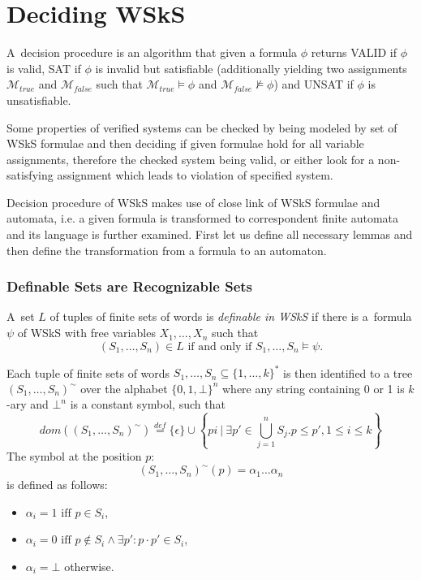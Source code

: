 \section{Deciding WSkS}\label{classical}

A~decision procedure is an algorithm that given a formula $\phi$ returns VALID if $\phi$ is valid, SAT if $\phi$ is invalid but satisfiable (additionally yielding two assignments $\mathcal{M}_{true}$ and $\mathcal{M}_{false}$ such that $\mathcal{M}_{true} \vDash \phi$ and $\mathcal{M}_{false} \not\vDash \phi$) and UNSAT if $\phi$ is unsatisfiable.

Some properties of verified systems can be checked by being modeled by set of WSkS formulae and then deciding if given formulae hold for all variable assignments, therefore the checked system being valid, or either look for a non-satisfying assignment which leads to violation of specified system.

Decision procedure of WSkS makes use of close link of WSkS formulae and automata, i.e. a given formula is transformed to correspondent finite automata and its language is further examined. First let us define all necessary lemmas and then define the transformation from a formula to an automaton.

 \subsubsection{Definable Sets are Recognizable Sets}
\begin{defz}
 A~set $L$ of tuples of finite sets of words is \emph{definable in WSkS} if there is a~formula $\psi$ of WSkS with free variables $X_1,\ldots,X_n$ such that $$(S_1,\ldots,S_n) \in L \text{ if and only if } S_1,\ldots,S_n \vDash \psi.$$
\end{defz}

Each tuple of finite sets of words $S_1,\ldots,S_n \subseteq \{1,\ldots,k\}^*$
is then identified to a tree $(S_1,\ldots,S_n)^\sim$ over the alphabet
$\{0,1,\bot\}^n$ where any string containing 0 or 1 is $k$-ary and $\bot^n$ is a constant symbol, such that
 \begin{equation}
  dom((S_1,\ldots,S_n)^\sim) \overset{def}{=} \{\epsilon\} \cup \left\{ pi\ |\ \exists p' \in \bigcup_{j = 1}^n S_j.p \leq p', 1 \leq i \leq k\right\}
 \end{equation}
The symbol at the position $p$: $$(S_1,\ldots,S_n)^\sim(p) = \alpha_1\ldots\alpha_n$$ is defined as follows:
 \begin{itemize}
  \item $\alpha_i = 1 \text{ iff } p \in S_i$,
  \item $\alpha_i = 0 \text{ iff } p \notin S_i \wedge \exists p': p\cdot p' \in S_i$,
  \item $\alpha_i = \bot$ otherwise.
 \end{itemize}
 
